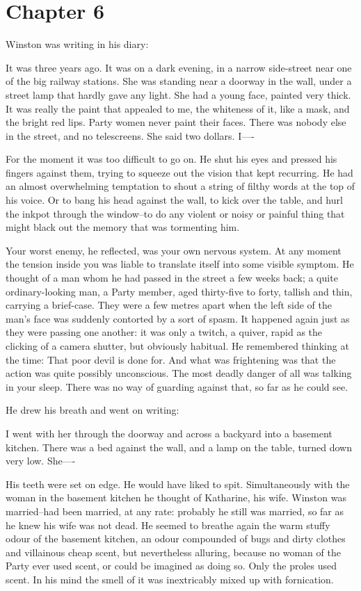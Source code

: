 \documentclass{article}
\begin{document}
\section{Chapter 6}



Winston was writing in his diary:


   It was three years ago. It was on a dark evening, in a narrow
side-street near one of the big railway stations. She was standing near a
doorway in the wall, under a street lamp that hardly gave any light. She
had a young face, painted very thick. It was really the paint that appealed
to me, the whiteness of it, like a mask, and the bright red lips. Party
women never paint their faces. There was nobody else in the street, and no
telescreens. She said two dollars. I----


For the moment it was too difficult to go on. He shut his eyes and pressed
his fingers against them, trying to squeeze out the vision that kept
recurring. He had an almost overwhelming temptation to shout a string of
filthy words at the top of his voice. Or to bang his head against the wall,
to kick over the table, and hurl the inkpot through the window--to do any
violent or noisy or painful thing that might black out the memory that was
tormenting him.

Your worst enemy, he reflected, was your own nervous system. At any moment
the tension inside you was liable to translate itself into some visible
symptom. He thought of a man whom he had passed in the street a few weeks
back; a quite ordinary-looking man, a Party member, aged thirty-five to
forty, tallish and thin, carrying a brief-case. They were a few metres
apart when the left side of the man's face was suddenly contorted by a sort
of spasm. It happened again just as they were passing one another: it was
only a twitch, a quiver, rapid as the clicking of a camera shutter, but
obviously habitual. He remembered thinking at the time: That poor devil is
done for. And what was frightening was that the action was quite possibly
unconscious. The most deadly danger of all was talking in your sleep. There
was no way of guarding against that, so far as he could see.

He drew his breath and went on writing:


   I went with her through the doorway and across a backyard into a
basement kitchen. There was a bed against the wall, and a lamp on the
table, turned down very low. She----


His teeth were set on edge. He would have liked to spit. Simultaneously
with the woman in the basement kitchen he thought of Katharine, his wife.
Winston was married--had been married, at any rate: probably he still was
married, so far as he knew his wife was not dead. He seemed to breathe
again the warm stuffy odour of the basement kitchen, an odour compounded
of bugs and dirty clothes and villainous cheap scent, but nevertheless
alluring, because no woman of the Party ever used scent, or could be
imagined as doing so. Only the proles used scent. In his mind the smell
of it was inextricably mixed up with fornication.
\end{document}
